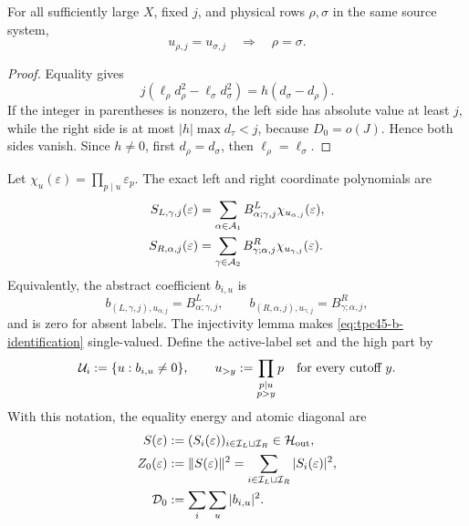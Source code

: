 \begin{lemma}
\label{lem:tpc45-label-injectivity}
For all sufficiently large \(X\), fixed \(j\), and physical rows
\(\rho,\sigma\) in the same source system,
\begin{equation}
 u_{\rho,j}=u_{\sigma,j}\quad\Longrightarrow\quad\rho=\sigma.
 \label{eq:tpc45-label-injectivity}
\end{equation}
\end{lemma}

\begin{proof}
Equality gives
\begin{equation}
 j(\ell_\rho d_\rho^2-\ell_\sigma d_\sigma^2)
 =h(d_\sigma-d_\rho).
 \label{eq:tpc45-label-collision}
\end{equation}
If the integer in parentheses is nonzero, the left side has absolute
value at least \(j\), while the right side is at most
\(|h|\max d_\tau<j\), because \(D_0=o(J)\).  Hence both sides vanish.
Since \(h\ne0\), first \(d_\rho=d_\sigma\), then
\(\ell_\rho=\ell_\sigma\).
\end{proof}

Let \(\chi_u(\varepsilon)=\prod_{p\mid u}\varepsilon_p\).  The exact
left and right coordinate polynomials are
\begin{align}
 S_{L,\gamma,j}(\varepsilon)
 &=\sum_{\alpha\in\mathcal A_1}
   B^L_{\alpha;\gamma,j}\chi_{u_{\alpha,j}}(\varepsilon),
 \label{eq:tpc45-left-coordinate-Walsh}\\
 S_{R,\alpha,j}(\varepsilon)
 &=\sum_{\gamma\in\mathcal A_2}
   B^R_{\gamma;\alpha,j}\chi_{u_{\gamma,j}}(\varepsilon).
 \label{eq:tpc45-right-coordinate-Walsh}
\end{align}
Equivalently, the abstract coefficient \(b_{i,u}\) is
\begin{equation}
 b_{(L,\gamma,j),u_{\alpha,j}}=B^L_{\alpha;\gamma,j},
 \qquad
 b_{(R,\alpha,j),u_{\gamma,j}}=B^R_{\gamma;\alpha,j},
 \label{eq:tpc45-b-identification}
\end{equation}
and is zero for absent labels.  The injectivity lemma makes
\eqref{eq:tpc45-b-identification} single-valued.  Define the active-label
set and the high part by
\begin{equation}
 \mathcal U_i:=\{u:b_{i,u}\ne0\},
 \qquad
 u_{>y}:=\prod_{\substack{p\mid u\\p>y}}p
 \quad\text{for every cutoff \(y\)}.
 \label{eq:tpc45-active-labels-high-part}
\end{equation}
With this notation, the equality energy and atomic diagonal are
\begin{equation}
 \begin{aligned}
  S(\varepsilon)
  &:=(S_i(\varepsilon))_{i\in\mathcal I_L\sqcup\mathcal I_R}
    \in\mathcal H_{\rm out},\\
  Z_0(\varepsilon)
  &:=\|S(\varepsilon)\|^2
    =\sum_{i\in\mathcal I_L\sqcup\mathcal I_R}|S_i(\varepsilon)|^2,\\
  \mathcal D_0&:=\sum_i\sum_u|b_{i,u}|^2.
 \end{aligned}
 \label{eq:tpc45-Z-and-diagonal}
\end{equation}

